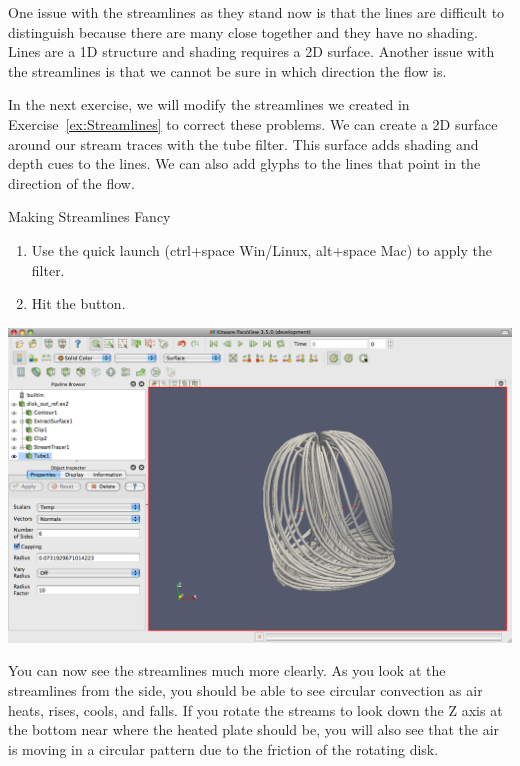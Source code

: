 One issue with the streamlines as they stand now is that the lines are
difficult to distinguish because there are many close together and they
have no shading.  Lines are a 1D structure and shading requires a 2D
surface.  Another issue with the streamlines is that we cannot be sure in which
direction the flow is.

In the next exercise, we will modify the streamlines we created in
Exercise~\ref{ex:Streamlines} to correct these problems.  We can create a
2D surface around our stream traces with the tube filter.  This surface
adds shading and depth cues to the lines.  We can also add glyphs to the
lines that point in the direction of the flow.

\begin{exercise}{Making Streamlines Fancy}
  \label{ex:MakingStreamlinesFancy}%
  \begin{enumerate}
  \item Use the quick launch (ctrl+space Win/Linux, alt+space Mac) to apply
    the  filter.
  \item Hit the \apply button.
    \savecounter
  \end{enumerate}

  \begin{inlinefig}
    \includegraphics[width=\scw]{images/StreamTracer1}
  \end{inlinefig}

  You can now see the streamlines much more clearly.  As you look at the
  streamlines from the side, you should be able to see circular convection
  as air heats, rises, cools, and falls.  If you rotate the streams to look
  down the Z axis at the bottom near where the heated plate should be, you
  will also see that the air is moving in a circular pattern due to the
  friction of the rotating disk.


\end{exercise}
